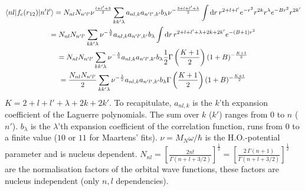 \documentclass[10pt]{article}
\begin{document}
\begin{itemize}
	\begin{multline}
		\braket{ n l |  f_{c}(r_{12}) | n' l'} = N_{nl} N_{n'l'} \nu^{\frac{l + l' + 3}{2}} \sum_{kk'\lambda} a_{nl,k} a_{n'l',k'} b_{\lambda}  \nu^{- \frac{3 + l + l' + \lambda}{2}} \int \text{d} r \, r^{2+l+l'} e^{-r^{2}} r^{2k} r^{\lambda} e^{-B r^{2}} r^{2k'} \\
		= N_{nl} N_{n'l'} \sum_{kk'\lambda} \nu^{-\frac{\lambda}{2}}  a_{nl,k} a_{n'l',k'} b_{\lambda} \int \text{d} r \, r^{2+l+l'+\lambda + 2k + 2k'} e^{-(B+1) r^{2}} \\
		=  N_{nl} N_{n'l'}  \sum_{kk'\lambda} \nu^{-\frac{\lambda}{2}} a_{nl,k} a_{n'l',k'} b_{\lambda} \frac{1}{2} \Gamma \left( \frac{K+1}{2} \right) (1 + B)^{-\frac{K+1}{2}} \\
		= \frac{N_{nl} N_{n'l'}}{2}  \sum_{kk'\lambda} \nu^{-\frac{\lambda}{2}} a_{nl,k} a_{n'l',k'} b_{\lambda} \Gamma \left( \frac{K+1}{2} \right) (1 + B)^{-\frac{K+1}{2}}
		\label{eq:central_corr_single}
	\end{multline}
	$K = 2+l+l'+ \lambda + 2k + 2k'$. To recapitulate, $a_{nl,k}$ is the $k$'th expansion coefficient of the Laguerre polynomials. The sum over $k$ ($k'$) ranges from $0$ to $n$ ($n'$). $b_{\lambda}$ is the $\lambda$'th expansion coefficient of the correlation function, runs from $0$ to a finite value ($10$ or $11$ for Maartens' fits). $\nu = M_N \omega /\hbar$ is the H.O.-potential parameter and is nucleus dependent. $N_{nl} = \left[ \frac{2n!}{\Gamma(n + l + 3/2)} \right]^{\frac{1}{2}} = \left[ \frac{ 2 \, \Gamma( n + 1)}{\Gamma(n + l + 3/2)} \right]^{\frac{1}{2}} $ are the normalisation factors of the orbital wave functions, these factors are nucleus independent (only $n,l$ dependencies).


\end{itemize}
\end{document}
